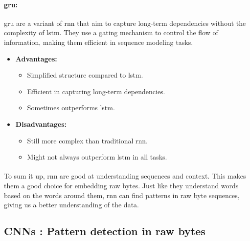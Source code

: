         \paragraph{\acrfull{gru}\cite{chung_empirical_2014}:} \acrshort{gru} are a variant of \acrshort{rnn} that aim to capture long-term dependencies without the complexity of \acrshort{lstm}. They use a gating mechanism to control the flow of information, making them efficient in sequence modeling tasks.

        \begin{itemize}
            \item \textbf{Advantages:} 
            \begin{itemize}
                \item Simplified structure compared to \acrshort{lstm}.
                \item Efficient in capturing long-term dependencies.
                \item Sometimes outperforms \acrshort{lstm}.
            \end{itemize}
            \item \textbf{Disadvantages:} 
            \begin{itemize}
                \item Still more complex than traditional \acrshort{rnn}.
                \item Might not always outperform \acrshort{lstm} in all tasks.
            \end{itemize}
        \end{itemize}
        

        \paragraph{}To sum it up, \acrshort{rnn} are good at understanding sequences and context. This makes them a good choice for embedding raw bytes. Just like they understand words based on the words around them, \acrshort{rnn} can find patterns in raw byte sequences, giving us a better understanding of the data.
    \subsection{CNNs : Pattern detection in raw bytes}
